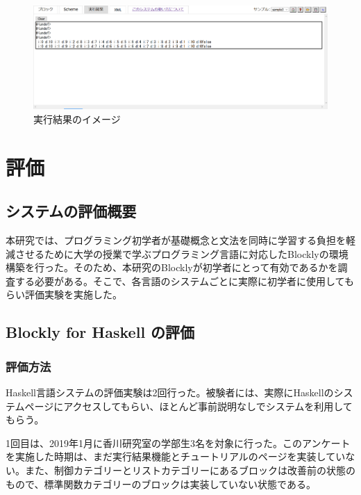 \documentclass{risepaper}
\begin{document}
\begin{figure}[h]
\begin{center}
\includegraphics[scale=0.5]{img/execution_result.PNG}
\caption{実行結果のイメージ}%
\label{fig:excution_result}
\end{center}%
\end{figure}%

   \chapter{評価}
   
   \section{システムの評価概要}
   
本研究では、プログラミング初学者が基礎概念と文法を同時に学習する負担を軽減させるために大学の授業で学ぶプログラミング言語に対応したBlocklyの環境構築を行った。そのため、本研究のBlocklyが初学者にとって有効であるかを調査する必要がある。そこで、各言語のシステムごとに実際に初学者に使用してもらい評価実験を実施した。

   \section{Blockly for Haskell の評価}
   
   		\subsection{評価方法}
Haskell言語システムの評価実験は2回行った。被験者には、実際にHaskellのシステムページにアクセスしてもらい、ほとんど事前説明なしでシステムを利用してもらう。

1回目は、2019年1月に香川研究室の学部生3名を対象に行った。このアンケートを実施した時期は、まだ実行結果機能とチュートリアルのページを実装していない。また、制御カテゴリーとリストカテゴリーにあるブロックは改善前の状態のもので、標準関数カテゴリーのブロックは実装していない状態である。
\end{document}
